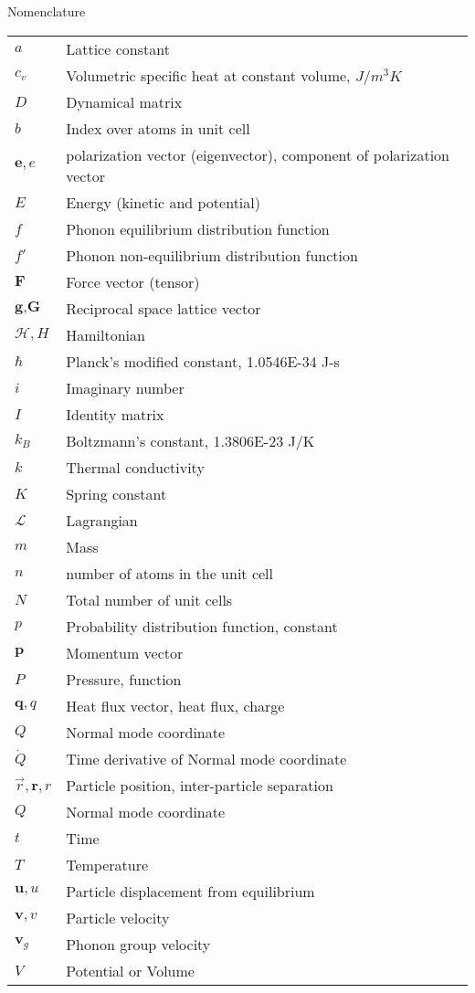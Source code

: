\setlength{\LTleft}{0pt}
Nomenclature\\
\begin{longtable}{ l l }
$a$ & Lattice constant \\
$c_v$ & Volumetric specific heat at constant volume, $J/m^3K$\\
$D$ & Dynamical matrix\\
$b$ & Index over atoms in unit cell \\
$\textbf{e},e$ & polarization vector (eigenvector), component of polarization vector\\
$E$ & Energy (kinetic and potential)\\
$f$ & Phonon equilibrium distribution function\\
$f'$ & Phonon non-equilibrium distribution function\\
$\textbf{F}$ & Force vector (tensor)\\
$\textbf{g},\textbf{G}$ & Reciprocal space lattice vector\\
$\mathscr{H}, H$ & Hamiltonian \\
$\hbar$ & Planck's modified constant, 1.0546E-34 J-s\\
$i$ & Imaginary number\\
$I$ & Identity matrix\\
$k_B$ & Boltzmann's constant, 1.3806E-23 J/K\\
$k$ & Thermal conductivity\\
$K$ & Spring constant\\
$\mathscr{L}$ & Lagrangian \\
$m$ & Mass\\
$n$ & number of atoms in the unit cell\\
$N$ & Total number of unit cells\\
$p$ & Probability distribution function, constant\\
$\textbf{p}$ & Momentum vector\\
$P$ & Pressure, function\\
$\textbf{q},q$ & Heat flux vector, heat flux, charge\\
$Q$ & Normal mode coordinate\\
$\dot{Q}$ & Time derivative of Normal mode coordinate\\
$\vec{r},\textbf{r},r$ & Particle position, inter-particle separation\\
$Q$ & Normal mode coordinate\\
$t$ & Time\\
$T$ & Temperature\\
$\textbf{u},u$ & Particle displacement from equilibrium\\
$\textbf{v},v$ & Particle velocity\\
$\textbf{v}_g$ & Phonon group velocity\\
$V$ & Potential or Volume\\
\end{longtable}

